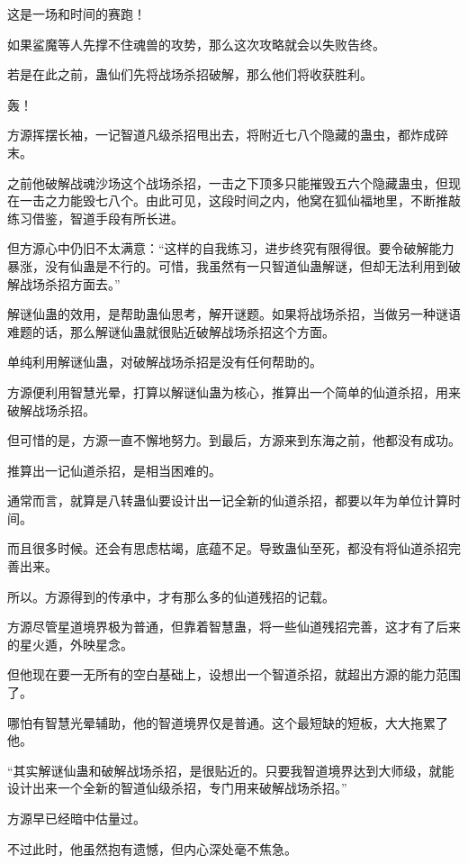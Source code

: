 
\begin{this_body}

这是一场和时间的赛跑！

如果鲨魔等人先撑不住魂兽的攻势，那么这次攻略就会以失败告终。

若是在此之前，蛊仙们先将战场杀招破解，那么他们将收获胜利。

轰！

方源挥摆长袖，一记智道凡级杀招甩出去，将附近七八个隐藏的蛊虫，都炸成碎末。

之前他破解战魂沙场这个战场杀招，一击之下顶多只能摧毁五六个隐藏蛊虫，但现在一击之力能毁七八个。由此可见，这段时间之内，他窝在狐仙福地里，不断推敲练习借鉴，智道手段有所长进。

但方源心中仍旧不太满意：“这样的自我练习，进步终究有限得很。要令破解能力暴涨，没有仙蛊是不行的。可惜，我虽然有一只智道仙蛊解谜，但却无法利用到破解战场杀招方面去。”

解谜仙蛊的效用，是帮助蛊仙思考，解开谜题。如果将战场杀招，当做另一种谜语难题的话，那么解谜仙蛊就很贴近破解战场杀招这个方面。

单纯利用解谜仙蛊，对破解战场杀招是没有任何帮助的。

方源便利用智慧光晕，打算以解谜仙蛊为核心，推算出一个简单的仙道杀招，用来破解战场杀招。

但可惜的是，方源一直不懈地努力。到最后，方源来到东海之前，他都没有成功。

推算出一记仙道杀招，是相当困难的。

通常而言，就算是八转蛊仙要设计出一记全新的仙道杀招，都要以年为单位计算时间。

而且很多时候。还会有思虑枯竭，底蕴不足。导致蛊仙至死，都没有将仙道杀招完善出来。

所以。方源得到的传承中，才有那么多的仙道残招的记载。

方源尽管星道境界极为普通，但靠着智慧蛊，将一些仙道残招完善，这才有了后来的星火遁，外映星念。

但他现在要一无所有的空白基础上，设想出一个智道杀招，就超出方源的能力范围了。

哪怕有智慧光晕辅助，他的智道境界仅是普通。这个最短缺的短板，大大拖累了他。

“其实解谜仙蛊和破解战场杀招，是很贴近的。只要我智道境界达到大师级，就能设计出来一个全新的智道仙级杀招，专门用来破解战场杀招。”

方源早已经暗中估量过。

不过此时，他虽然抱有遗憾，但内心深处毫不焦急。


\end{this_body}
